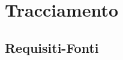 

\section{Tracciamento} %
\label{sec:tracciamento}
	\subsection{Requisiti-Fonti} %
	\label{ssub:requisiti_fonti}

